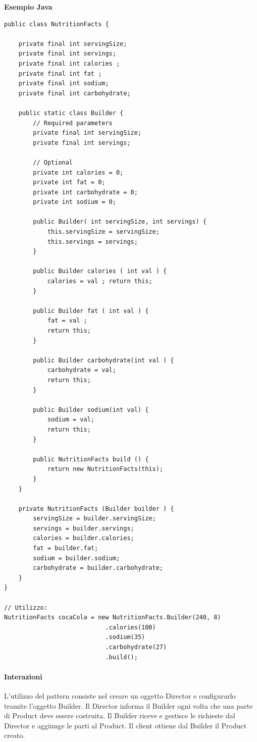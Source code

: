 \textbf{Esempio Java}

\begin{verbatim}
public class NutritionFacts { 

    private final int servingSize; 
    private final int servings; 
    private final int calories ; 
    private final int fat ; 
    private final int sodium; 
    private final int carbohydrate; 
    
    public static class Builder { 
        // Required parameters 
        private final int servingSize; 
        private final int servings; 
        
        // Optional 
        private int calories = 0; 
        private int fat = 0; 
        private int carbohydrate = 0; 
        private int sodium = 0; 
        
        public Builder( int servingSize, int servings) { 
            this.servingSize = servingSize; 
            this.servings = servings; 
        } 
        
        public Builder calories ( int val ) { 
            calories = val ; return this;
        } 
        
        public Builder fat ( int val ) { 
            fat = val ; 
            return this; 
        } 
        
        public Builder carbohydrate(int val ) {
            carbohydrate = val; 
            return this; 
        } 
        
        public Builder sodium(int val) { 
            sodium = val; 
            return this; 
        } 
        
        public NutritionFacts build () { 
            return new NutritionFacts(this); 
        } 
    }
    
    private NutritionFacts (Builder builder ) { 
        servingSize = builder.servingSize; 
        servings = builder.servings; 
        calories = builder.calories; 
        fat = builder.fat;
        sodium = builder.sodium; 
        carbohydrate = builder.carbohydrate;
    }
}

// Utilizzo:
NutritionFacts cocaCola = new NutritionFacts.Builder(240, 8)
                            .calories(100)
                            .sodium(35)
                            .carbohydrate(27)
                            .build();

\end{verbatim}

\paragraph{Interazioni} L'utilizzo del pattern consiste nel creare un oggetto Director e configurarlo tramite l'oggetto Builder. Il Director informa il Builder ogni volta che una parte di Product deve essere costruita. Il Builder riceve e gestisce le richieste dal Director e aggiunge le parti al Product. Il client ottiene dal Builder il Product creato.

